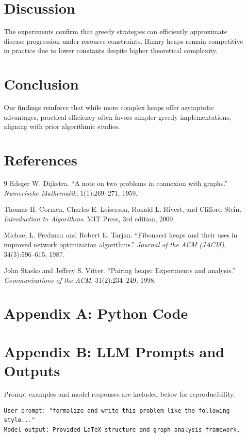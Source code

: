 \documentclass[11pt]{article}
\begin{document}
\section{Discussion}
The experiments confirm that greedy strategies can efficiently approximate disease progression under resource constraints. Binary heaps remain competitive in practice due to lower constants despite higher theoretical complexity.

\section{Conclusion}
Our findings reinforce that while more complex heaps offer asymptotic advantages, practical efficiency often favors simpler greedy implementations, aligning with prior algorithmic studies.

\section*{References}
\begin{thebibliography}{9}
Edsger W. Dijkstra. ``A note on two problems in connexion with graphs.'' \emph{Numerische Mathematik}, 1(1):269–271, 1959.

Thomas H. Cormen, Charles E. Leiserson, Ronald L. Rivest, and Clifford Stein. \emph{Introduction to Algorithms}. MIT Press, 3rd edition, 2009.

Michael L. Fredman and Robert E. Tarjan. ``Fibonacci heaps and their uses in improved network optimization algorithms.'' \emph{Journal of the ACM (JACM)}, 34(3):596–615, 1987.

John Stasko and Jeffrey S. Vitter. ``Pairing heaps: Experiments and analysis.'' \emph{Communications of the ACM}, 31(2):234–249, 1998.
\end{thebibliography}

\appendix
\section*{Appendix A: Python Code}


\section*{Appendix B: LLM Prompts and Outputs}
Prompt examples and model responses are included below for reproducibility.

\begin{verbatim}
User prompt: "formalize and write this problem like the following style..."
Model output: Provided LaTeX structure and graph analysis framework.
\end{verbatim}
\end{document}
